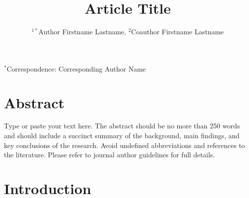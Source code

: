 \documentclass[12pt]{Definitions/academia}
\begin{document}





\title{Article Title}


\author{$^{1*}$Author Firstname Lastname, $^{2}$Coauthor Firstname Lastname}

\maketitle


\noindent $^{*}$Correspondence:  Corresponding Author Name

\section*{Abstract}
Type or paste your text here. The abstract should be no more than 250 words and should include a succinct summary of the background, main findings, and key conclusions of the research. Avoid undefined abbreviations and references to the literature. Please refer to journal author guidelines for full details.


\section{Introduction}\label{sec1}
\end{document}
